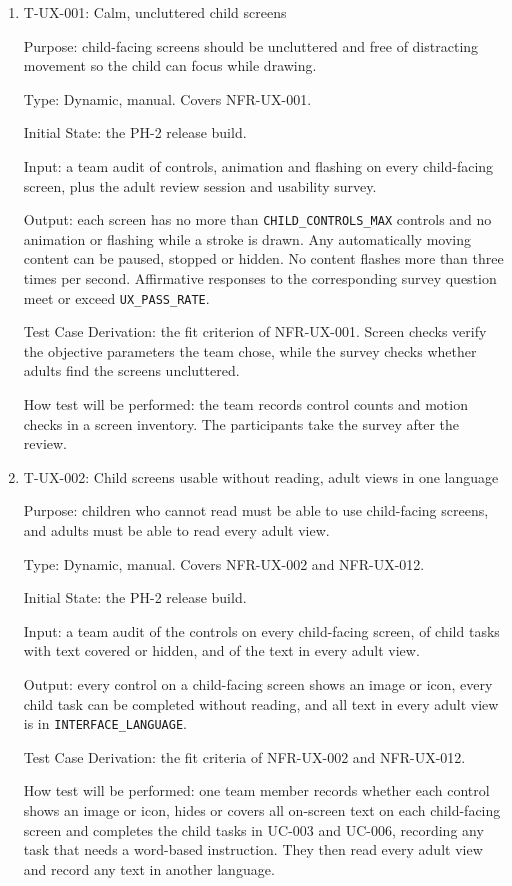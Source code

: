 \documentclass[12pt, titlepage]{article}
\newcommand{\testitem}[1]{\item #1\par\nopagebreak}
\begin{document}
\begin{enumerate}

\testitem{T-UX-001: Calm, uncluttered child screens}

Purpose: child-facing screens should be uncluttered and free of distracting
movement so the child can focus while drawing.

Type: Dynamic, manual. Covers NFR-UX-001.

Initial State: the PH-2 release build.

Input: a team audit of controls, animation and flashing on every child-facing
screen, plus the adult review session and usability survey.

Output: each screen has no more than \texttt{CHILD\_CONTROLS\_MAX} controls
and no animation or flashing while a stroke is drawn. Any automatically moving 
content can be paused, stopped or hidden. No content flashes more than three 
times per second. Affirmative responses to the corresponding survey question 
meet or exceed \texttt{UX\_PASS\_RATE}.

Test Case Derivation: the fit criterion of NFR-UX-001. Screen checks verify
the objective parameters the team chose, while the survey checks whether adults
find the screens uncluttered.

How test will be performed: the team records control counts and motion
checks in a screen inventory. The participants take the survey after the 
review.

\testitem{T-UX-002: Child screens usable without reading, adult views in one language}

Purpose: children who cannot read must be able to use child-facing screens,
and adults must be able to read every adult view.

Type: Dynamic, manual. Covers NFR-UX-002 and NFR-UX-012.

Initial State: the PH-2 release build.

Input: a team audit of the controls on every child-facing screen, of child tasks
with text covered or hidden, and of the text in every adult view.

Output: every control on a child-facing screen shows an image or icon, every
child task can be completed without reading, and all text in every adult view is
in \texttt{INTERFACE\_LANGUAGE}.

Test Case Derivation: the fit criteria of NFR-UX-002 and NFR-UX-012.

How test will be performed: one team member records whether each control shows
an image or icon, hides or covers all on-screen text on each child-facing screen
and completes the child tasks in UC-003 
and UC-006, recording any task that needs a word-based instruction. They
then read every adult view and record any text in another language.


\end{enumerate}
\end{document}
